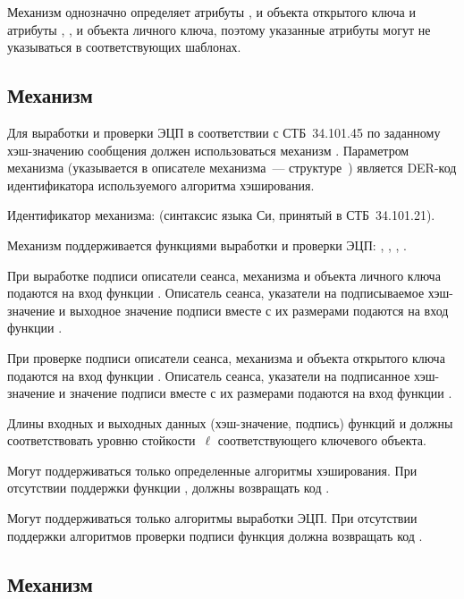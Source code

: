 Механизм однозначно определяет атрибуты 
,  и 
объекта открытого ключа и атрибуты
, ,  и 
 объекта личного ключа,
поэтому указанные атрибуты могут не указываться в
соответствующих шаблонах.

\subsection{Механизм }\label{CRYPTOKI.SignHSpec}

Для выработки и проверки ЭЦП в соответствии с СТБ~34.101.45 по 
заданному хэш-значению сообщения должен использоваться механизм 
. 
%
Параметром механизма (указывается в описателе механизма~--- 
структуре~) является DER-код идентификатора 
используемого алгоритма хэширования.

Идентификатор механизма:  
(синтаксис языка Си, принятый в СТБ~34.101.21). 

Механизм поддерживается функциями выработки и проверки ЭЦП: 
, , , .

При выработке подписи описатели сеанса, механизма и объекта
личного ключа подаются на вход функции .
Описатель сеанса, указатели на подписываемое хэш-значение и выходное 
значение подписи вместе с их размерами подаются на вход функции 
.

При проверке подписи описатели сеанса, механизма и объекта
открытого ключа подаются на вход функции .
Описатель сеанса, указатели на подписанное хэш-значение и значение подписи 
вместе с их размерами подаются на вход функции .

Длины входных и выходных данных (хэш-значение, подпись) функций
 и  должны соответствовать
уровню стойкости~$\ell$ соответствующего ключевого объекта.

Могут поддерживаться только определенные алгоритмы хэширования.
При отсутствии поддержки функции ,
 должны возвращать код 
.

Могут поддерживаться только алгоритмы выработки ЭЦП.
При отсутствии поддержки алгоритмов проверки подписи
функция  должна возвращать код 
.

\subsection{Механизм }\label{CRYPTOKI.SignHBelt}

